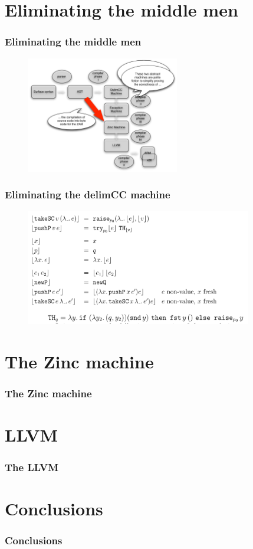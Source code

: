 \documentclass{beamer}
\begin{document}
  \section{Eliminating the middle men}
  \begin{frame}
    \frametitle{Eliminating the middle men}
    \begin{figure}[ht]
      \begin{center}        
        \includegraphics[height=2in]{pipelinefigures/PoliteFictions.pdf}
      \end{center}      
    \end{figure}

  \end{frame}
  \begin{frame}
    \frametitle{Eliminating the delimCC machine}
    \begin{figure}[ht]
      \begin{center}        
        \includegraphics[height=2in]{pipelinefigures/EliminatingDelimCCMachine.pdf}
      \end{center}      
    \end{figure}

  \end{frame}
  \section{The Zinc machine}
  \begin{frame}
    \frametitle{The Zinc machine}
  \end{frame}
  \section{LLVM}
  \begin{frame}
    \frametitle{The LLVM}
  \end{frame}
  \section{Conclusions}
  \begin{frame}
    \frametitle{Conclusions}
  \end{frame}
\end{document}
